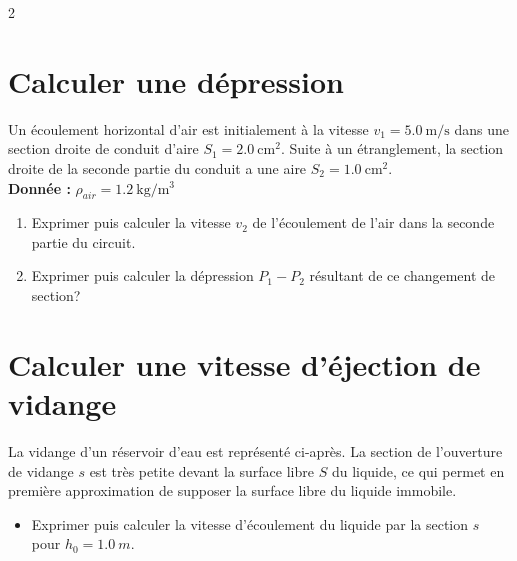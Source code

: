 \documentclass[a4paper,11pt,fleqn]{scrartcl}%
\begin{document}
\begin{multicols}{2}
\section{Calculer une dépression}
Un écoulement  horizontal d'air est initialement à la vitesse $v_1=\SI{5,0}{\meter\per\second}$ dans une section droite de conduit d'aire $S_1=\SI{2,0}{\centi\meter\squared}$. Suite à un étranglement, la section droite de la seconde partie du conduit a une aire $S_2=\SI{1,0}{\centi\meter\squared}$.\\
\textbf{Donnée :} $\rho_{air} =\SI{1,2}{\kilo\gram\per\meter\cubed}$
\begin{enumerate}
	\item Exprimer puis calculer la vitesse $v_2$ de l'écoulement de l'air dans la seconde partie du circuit.
	\item Exprimer puis calculer la dépression $P_1-P_2$ résultant de ce changement de section?
\end{enumerate}

\section{Calculer une vitesse d'éjection de vidange}
La vidange d'un réservoir d'eau est représenté ci-après. La section de l'ouverture de vidange $s$ est très petite devant la surface libre $S$ du liquide, ce qui permet en première approximation de supposer la surface libre du liquide immobile.
\begin{itemize}
	\item Exprimer puis calculer la vitesse d'écoulement du liquide par la section $s$ pour $h_0=\SI{1,0}{m}$.
\end{itemize}
\begin{center}
\end{center}



\end{multicols}
\end{document}
